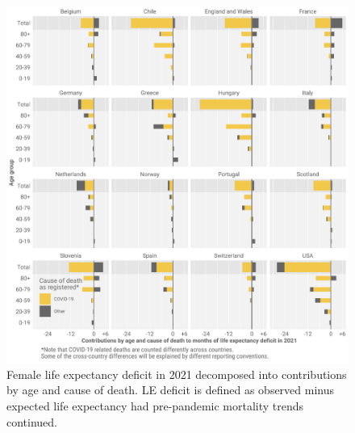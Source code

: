 \documentclass[12pt]{article}
\begin{document}
\begin{figure}[ht!]
    \centering
    \includegraphics{figure-a6.pdf}
    \caption{Female life expectancy deficit in 2021 decomposed into contributions by age and cause of death. LE deficit is defined as observed minus expected life expectancy had pre-pandemic mortality trends continued.}
    \label{fig:figure-a6}
\end{figure}
\end{document}
